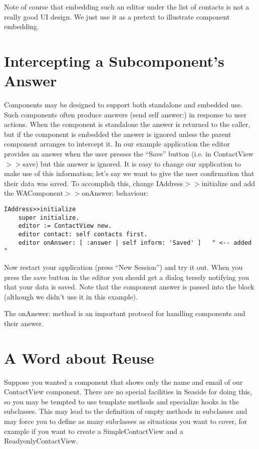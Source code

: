 \documentclass[a4paper,10pt,twoside]{book}
\newcommand{\ct}[1]{{\small\ttfamily\textup{#1}}}
\begin{document}
Note of course that embedding such an editor under the list of contacts is not a really good UI design. We just use it as a pretext to illustrate component embedding.

\section{Intercepting a Subcomponent's Answer}
\label{book:components:embedding:interceptinganswer}

Components may be designed to support both standalone and embedded use. Such components often produce answers (send \ct{self answer:}) in response to user actions. When the component is standalone the answer is returned to the caller, but if the component is embedded the answer is ignored unless the parent component arranges to intercept it. In our example application the editor provides an answer when the user presses the ``Save'' button (i.e. in \ct{ContactView$>$$>$save}) but this answer is ignored. It is easy to change our application to make use of this information; let's say we want to give the user confirmation that their data was saved. To accomplish this, change \ct{IAddress$>$$>$initialize} and add the  \ct{WAComponent$>$$>$onAnswer:} behaviour:

\begin{lstlisting}
IAddress>>initialize
    super initialize.
    editor := ContactView new.
    editor contact: self contacts first.
    editor onAnswer: [ :answer | self inform: 'Saved' ]   " <-- added "
\end{lstlisting}

Now restart your application (press ``New Session'') and try it out. When you press the save button in the editor you should get a dialog tersely notifying you that your data is saved. Note that the component answer is passed into the block (although we didn't use it in this example). 

The \ct{onAnswer:} method is an important protocol for handling components and their answer.

\section{A Word about Reuse}
\label{book:components:embedding:reuseing}

Suppose you wanted a component that shows only the name and email of our \ct{ContactView} component. There are no special facilities in Seaside for doing this, so you may be tempted to use template methods and specialize hooks in the subclasses. This may lead to the definition of empty methods in subclasses and may force you to define as many subclasses as situations you want to cover, for example if you want to create a \ct{SimpleContactView} and a \ct{ReadyonlyContactView}.
\end{document}
